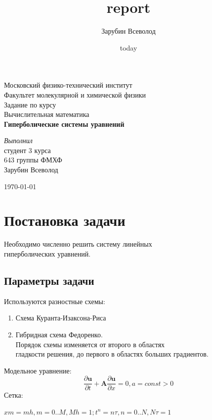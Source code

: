 \documentclass[a4paper,14pt]{article}
\title{report}
\author{Зарубин Всеволод}
\date{today}
\begin{document}
\begin{titlepage}
\begin{center} 
 
\large Московский физико-технический институт\\
Факультет молекулярной и химической физики\\
\vspace{6.5cm}
\Large Задание по курсу \\ Вычислительная математика\\
\textbf{\Large Гиперболические системы уравнений}\\
\end{center} 

\vspace{7cm}
{\par 
	\raggedleft \large 
	\emph{Выполнил}\\ 
	студент 3 курса\\ 
	643 группы ФМХФ\\ 
	Зарубин Всеволод 
\par}
\begin{center}
\vfill \today
\end{center}
\end{titlepage}
\newpage
\setcounter{page}{2}

\newpage
	\section{Постановка задачи}
    \Large Необходимо численно решить систему линейных \\гиперболических уравнений.\\
    \subsection{Параметры задачи}
    Используются разностные схемы:
    \begin{center}
    \begin{enumerate}
        \item Схема Куранта-Изаксона-Риса
        \item Гибридная схема Федоренко. \\
        Порядок схемы изменяется от второго в областях\\
        гладкости решения, до первого в областях больших градиентов.  
    \end{enumerate}
    \end{center}
    \vspace{0.5cm}
    Модельное уравнение:\\
    \begin{equation}
        \frac{\partial \mathbf{u}}{\partial t}+\mathbf{A} \frac{\partial \mathbf{u}}{\partial x} = 0,     a = const > 0
    \end{equation}
    \vspace{0.5cm}
    Сетка:
    \begin{center}
    $xm = mh, m = 0..M, Mh = 1; t^n = n\tau, n = 0..N, N\tau = 1$\\
    \end{center}
    \vspace{1cm}
\end{document}
